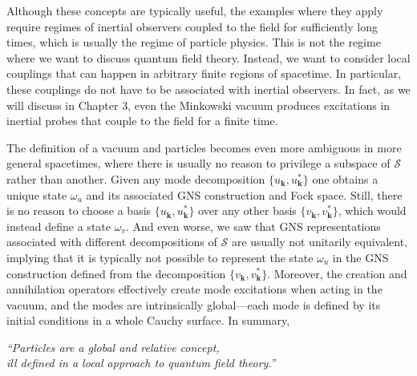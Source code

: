 \documentclass[letterpaper,12pt,titlepage,oneside,final]{book}
\renewcommand{\S}{\mathcal{S}}
\begin{document}
Although these concepts are typically useful, the examples where they apply require regimes of inertial observers coupled to the field for sufficiently long times, which is usually the regime of particle physics. This is not the regime where we want to discuss quantum field theory. Instead, we want to consider local couplings that can happen in arbitrary finite regions of spacetime. In particular, these couplings do not have to be associated with inertial observers. In fact, as we will discuss in Chapter 3, even the Minkowski vacuum produces excitations in inertial probes that couple to the field for a finite time. 

The definition of a vacuum and particles becomes even more ambiguous in more general spacetimes, where there is usually no reason to privilege a subspace of $\S$ rather than another. Given any mode decomposition $\{u_{\bm k},u_{\bm k}^*\}$ one obtains a unique state $\omega_u$ and its associated GNS construction and Fock space. Still, there is no reason to choose a basis $\{u_{\bm k},u_{\bm k}^*\}$ over any other basis $\{v_{\bm k},v_{\bm k}^*\}$, which would instead define a state $\omega_v$. And even worse, we saw that GNS representations associated with different decompositions of $\S$ are usually not unitarily equivalent, implying that it is typically not possible to represent the state $\omega_u$ in the GNS construction defined from the decomposition $\{v_{\bm k},v_{\bm k}^*\}$. Moreover, the creation and annihilation operators effectively create mode excitations when acting in the vacuum, and the modes are intrinsically global---each mode is defined by its initial conditions in a whole Cauchy surface. In summary,

\begin{center}
    \textit{``Particles are a global and relative concept, \\ill defined in a local approach to quantum field theory.''}  
\end{center}
\end{document}

